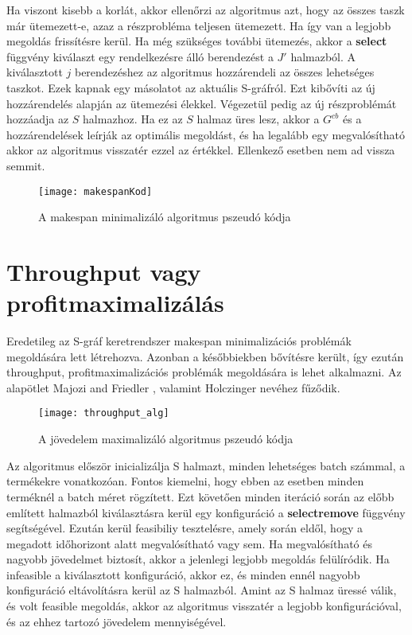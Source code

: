 Ha viszont kisebb a korlát, akkor ellenőrzi az algoritmus azt, hogy az összes taszk már ütemezett-e, azaz a részprobléma teljesen ütemezett. Ha így van a legjobb megoldás frissítésre kerül. Ha még szükséges további ütemezés, akkor a  \textbf{select} függvény kiválaszt egy rendelkezésre álló berendezést a $J'$ halmazból. A kiválasztott $j$ berendezéshez az algoritmus hozzárendeli az összes lehetséges taszkot. Ezek kapnak egy másolatot az aktuális S-gráfról. Ezt kibővíti az új hozzárendelés alapján az ütemezési élekkel. Végezetül pedig az új részproblémát hozzáadja az $S$ halmazhoz. Ha ez az $S$ halmaz üres lesz, akkor a $G^{cb}$ és a hozzárendelések leírják az optimális megoldást, és ha legalább egy megvalósítható akkor az algoritmus visszatér ezzel az értékkel. Ellenkező esetben nem ad vissza semmit.

\begin{figure}[H]
\begin{center}
\texttt{[image: makespanKod]}
\caption{A makespan minimalizáló algoritmus pszeudó kódja\cite{Hegyhati}}
\label{makespanKod}
\end{center}
\end{figure}

\section{Throughput vagy profitmaximalizálás}
Eredetileg az S-gráf keretrendszer makespan minimalizációs problémák megoldására lett létrehozva. Azonban a későbbiekben bővítésre került, így ezután throughput, profitmaximalizációs problémák megoldására is lehet alkalmazni. Az alapötlet Majozi and Friedler \cite{majozifriedler}, valamint Holczinger \cite{holczinger} nevéhez fűződik.
\begin{figure}[H]
\begin{center}
\texttt{[image: throughput\_alg]}
\caption{A jövedelem maximalizáló algoritmus pszeudó kódja \cite{Hegyhati}}
\label{throughput_alg}
\end{center}
\end{figure}
Az algoritmus először inicializálja S halmazt, minden lehetséges batch számmal, a termékekre vonatkozóan. Fontos kiemelni, hogy ebben az esetben minden terméknél a batch méret rögzített. Ezt követően minden iteráció során az előbb említett halmazból kiválasztásra kerül egy konfiguráció a \textbf{select\textunderscore remove} függvény segítségével. Ezután kerül feasibiliy tesztelésre, amely során eldől, hogy a megadott időhorizont alatt megvalósítható vagy sem. Ha megvalósítható és nagyobb jövedelmet biztosít, akkor a jelenlegi legjobb megoldás felülíródik. Ha infeasible a kiválasztott konfiguráció, akkor ez, és minden ennél nagyobb konfiguráció eltávolításra kerül az S halmazból. Amint az S halmaz üressé válik, és volt feasible megoldás, akkor az algoritmus visszatér a legjobb konfigurációval, és az ehhez tartozó jövedelem mennyiségével.


